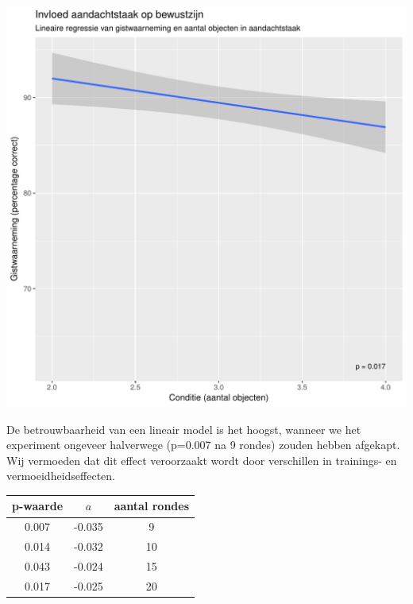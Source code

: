 \documentclass[a0,portrait]{a0poster}
\begin{document}
\begin{multicols}{3}
\begin{center}
\vspace{1cm}
	\includegraphics[width=0.8\linewidth]{lineaireRegressie.pdf}
\end{center}
De betrouwbaarheid van een lineair model is het hoogst, wanneer we het experiment ongeveer halverwege (p=0.007 na 9 rondes) zouden hebben afgekapt. Wij vermoeden dat dit effect veroorzaakt wordt door verschillen in trainings- en vermoeidheidseffecten.
\begin{center}
	\begin{tabular}{c c c}
		\hline
		p-waarde & $a$ & aantal rondes\\
		\hline
		0.007 & -0.035 & 9\\
		0.014 & -0.032 & 10\\
		0.043 & -0.024 & 15\\
		0.017 & -0.025 & 20\\
		\hline
	\end{tabular}
\end{center}

\end{multicols}
\end{document}
